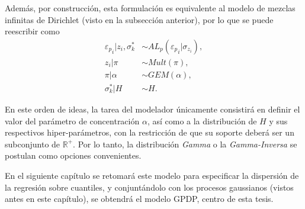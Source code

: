 Adem\'as, por construcci\'on, esta formulaci\'on es equivalente al modelo de mezclas infinitas de Dirichlet (visto en la subsecci\'on anterior), por lo que se puede reescribir como
\begin{equation*}
\begin{aligned}
   {\varepsilon_p}_i | z_i, \sigma_k^* &\sim AL_p({\varepsilon_p}_i | \sigma_{z_i}), \\
   z_i | \pi &\sim Mult(\pi), \\
   \pi | \alpha &\sim GEM(\alpha), \\
   \sigma_k^* | H &\sim H.
\end{aligned}
\end{equation*}

En este orden de ideas, la tarea del modelador \'unicamente consistir\'a en definir el valor del par\'ametro de concentraci\'on $\alpha$, as\'i como a la distribuci\'on de $H$ y sus respectivos hiper-par\'ametros, con la restricci\'on de que su soporte deber\'a ser un subconjunto de $\mathbb{R}^+$. Por lo tanto, la distribuci\'on \textit{Gamma} o la \textit{Gamma-Inversa} se postulan como opciones convenientes.

En el siguiente cap\'itulo se retomar\'a este modelo para especificar la dispersi\'on de la regresi\'on sobre cuantiles, y conjunt\'andolo con los procesos gaussianos (vistos antes en este cap\'itulo), se obtendr\'a el modelo GPDP, centro de esta tesis.

\newpage